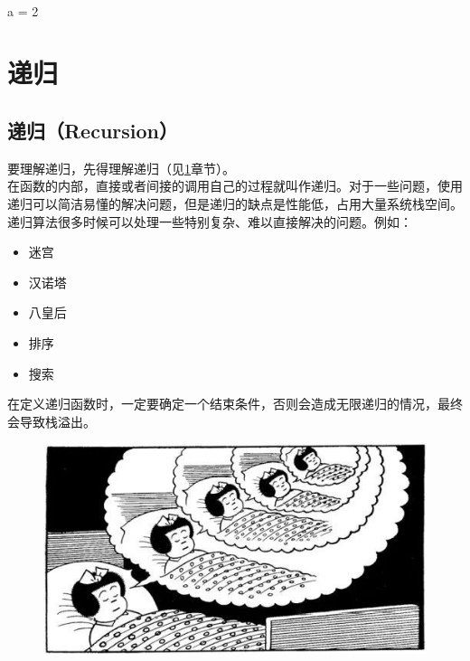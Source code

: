 \begin{tcolorbox}
	 \\
	a = 2
\end{tcolorbox}

\newpage

\section{递归} \label{recursive}

\subsection{递归（Recursion）}

要理解递归，先得理解递归（见\ref{recursive}章节）。 \\

在函数的内部，直接或者间接的调用自己的过程就叫作递归。对于一些问题，使用递归可以简洁易懂的解决问题，但是递归的缺点是性能低，占用大量系统栈空间。 \\

递归算法很多时候可以处理一些特别复杂、难以直接解决的问题。例如：

\begin{itemize}
	\item 迷宫
	\item 汉诺塔
	\item 八皇后
	\item 排序
	\item 搜索
\end{itemize}

在定义递归函数时，一定要确定一个结束条件，否则会造成无限递归的情况，最终会导致栈溢出。

\begin{figure}[H]
	\centering
	\includegraphics[scale=0.7]{img/C13/13-3/1.png}
\end{figure}

